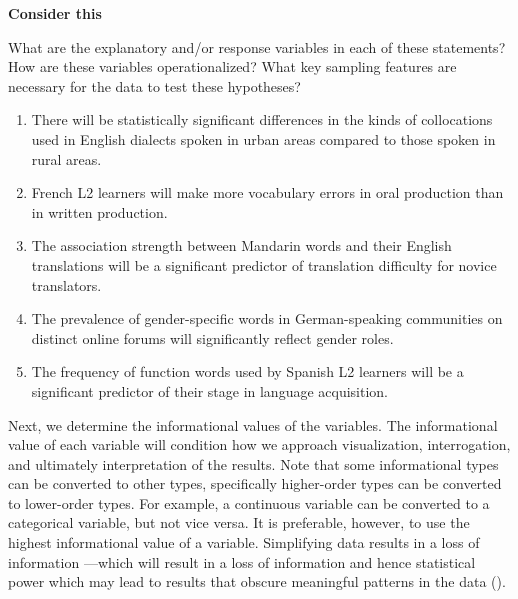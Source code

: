 \documentclass[
  letterpaper,
  krantz1]{latex/krantz-mod}
\providecommand{\tightlist}{%
  \setlength{\itemsep}{0pt}\setlength{\parskip}{0pt}}\usepackage{longtable,booktabs,array}
\theoremstyle{definition}
\theoremstyle{definition}
\theoremstyle{remark}
\begin{document}
\begin{tcolorbox}[enhanced jigsaw, toprule=.15mm, breakable, colback=white, arc=.35mm, left=2mm, colframe=quarto-callout-color-frame, opacityback=0, bottomrule=.15mm, rightrule=.15mm, leftrule=.75mm]

\textbf{ Consider this}

What are the explanatory and/or response variables in each of these
statements? How are these variables operationalized? What key sampling
features are necessary for the data to test these hypotheses?

\begin{enumerate}
\def\labelenumi{\arabic{enumi}.}
\tightlist
\item
  There will be statistically significant differences in the kinds of
  collocations used in English dialects spoken in urban areas compared
  to those spoken in rural areas.
\item
  French L2 learners will make more vocabulary errors in oral production
  than in written production.
\item
  The association strength between Mandarin words and their English
  translations will be a significant predictor of translation difficulty
  for novice translators.
\item
  The prevalence of gender-specific words in German-speaking communities
  on distinct online forums will significantly reflect gender roles.
\item
  The frequency of function words used by Spanish L2 learners will be a
  significant predictor of their stage in language acquisition.
\end{enumerate}

\end{tcolorbox}

Next, we determine the informational values
of the variables. The informational value of each
variable will condition how we approach visualization, interrogation,
and ultimately interpretation of the results. Note that some
informational types can be converted to other types, specifically
higher-order types can be converted to lower-order types. For example, a
continuous variable can be converted to a
categorical variable, but not vice versa.
It is preferable, however, to use the highest informational value of a
variable. Simplifying data results in a loss of information ---which
will result in a loss of information and hence statistical power which
may lead to results that obscure meaningful patterns in the data
().
\end{document}
